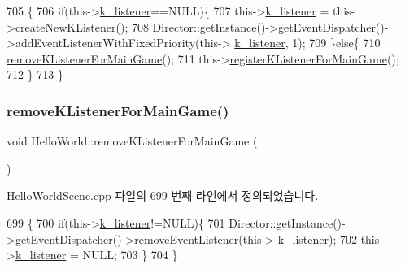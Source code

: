 \begin{DoxyCode}
705                                              \{
706     \textcolor{keywordflow}{if}(this->\hyperlink{class_hello_world_a70a88f59eefadb6a03bd0b3d0ec9cc88}{k\_listener}==NULL)\{
707         this->\hyperlink{class_hello_world_a70a88f59eefadb6a03bd0b3d0ec9cc88}{k\_listener} = this->\hyperlink{class_hello_world_ab43ad3eb748cab6180daf5a8cfdcf207}{createNewKListener}();
708         Director::getInstance()->getEventDispatcher()->addEventListenerWithFixedPriority(this->
      \hyperlink{class_hello_world_a70a88f59eefadb6a03bd0b3d0ec9cc88}{k\_listener}, 1);
709     \}\textcolor{keywordflow}{else}\{
710         \hyperlink{class_hello_world_aa4aaf4a6d2ae2e0cb07273d0ee004861}{removeKListenerForMainGame}();
711         this->\hyperlink{class_hello_world_a15deb2e6546d6fd41267dc91932ade26}{registerKListenerForMainGame}();
712     \}
713 \}
\end{DoxyCode}
\mbox{\label{class_hello_world_aa4aaf4a6d2ae2e0cb07273d0ee004861}} 
\subsubsection{\texorpdfstring{remove\+K\+Listener\+For\+Main\+Game()}{removeKListenerForMainGame()}}
{\footnotesize\ttfamily void Hello\+World\+::remove\+K\+Listener\+For\+Main\+Game (\begin{DoxyParamCaption}{ }\end{DoxyParamCaption})\hspace{0.3cm}{\ttfamily [protected]}}



Hello\+World\+Scene.\+cpp 파일의 699 번째 라인에서 정의되었습니다.


\begin{DoxyCode}
699                                            \{
700     \textcolor{keywordflow}{if}(this->\hyperlink{class_hello_world_a70a88f59eefadb6a03bd0b3d0ec9cc88}{k\_listener}!=NULL)\{
701         Director::getInstance()->getEventDispatcher()->removeEventListener(this->
      \hyperlink{class_hello_world_a70a88f59eefadb6a03bd0b3d0ec9cc88}{k\_listener});
702         this->\hyperlink{class_hello_world_a70a88f59eefadb6a03bd0b3d0ec9cc88}{k\_listener} = NULL;
703     \}
704 \}
\end{DoxyCode}
\mbox{\label{class_hello_world_ad72b45627fe36ea8cd04b9de431edc7f}} 
